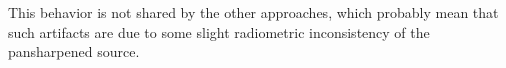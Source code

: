\documentclass[journal]{IEEEtran}
\newcommand{\method}{$MRFusion$}
\begin{document}
This behavior is not shared by the other approaches, which probably mean that such artifacts are due to some slight radiometric inconsistency of the pansharpened source. %
\end{document}
